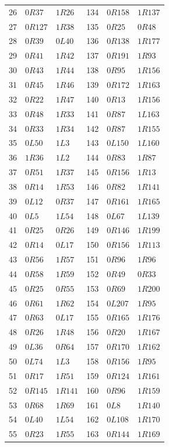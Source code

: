 \begin{longtable}{rll@{\qquad}rll}
26 & $0R37$ & $1R26$ & 134 & $0R158$ & $1R137$\\
27 & $0R127$ & $1R38$ & 135 & $0R25$ & $0R48$\\
28 & $0R39$ & $0L40$ & 136 & $0R138$ & $1R177$\\
29 & $0R41$ & $1R42$ & 137 & $0R191$ & $1R93$\\
30 & $0R43$ & $1R44$ & 138 & $0R95$ & $1R156$\\
31 & $0R45$ & $1R46$ & 139 & $0R172$ & $1R163$\\
32 & $0R22$ & $1R47$ & 140 & $0R13$ & $1R156$\\
33 & $0R48$ & $1R33$ & 141 & $0R87$ & $1L163$\\
34 & $0R33$ & $1R34$ & 142 & $0R87$ & $1R155$\\
35 & $0L50$ & $1L3$ & 143 & $0L150$ & $1L160$\\
36 & $1R36$ & $1L2$ & 144 & $0R83$ & $1R87$\\
37 & $0R51$ & $1R37$ & 145 & $0R156$ & $1R13$\\
38 & $0R14$ & $1R53$ & 146 & $0R82$ & $1R141$\\
39 & $0L12$ & $0R37$ & 147 & $0R161$ & $1R165$\\
40 & $0L5$ & $1L54$ & 148 & $0L67$ & $1L139$\\
41 & $0R25$ & $0R26$ & 149 & $0R146$ & $1R199$\\
42 & $0R14$ & $0L17$ & 150 & $0R156$ & $1R113$\\
43 & $0R56$ & $1R57$ & 151 & $0R96$ & $1R96$\\
44 & $0R58$ & $1R59$ & 152 & $0R49$ & $0R33$\\
45 & $0R25$ & $0R55$ & 153 & $0R69$ & $1R200$\\
46 & $0R61$ & $1R62$ & 154 & $0L207$ & $1R95$\\
47 & $0R63$ & $0L17$ & 155 & $0R165$ & $1R176$\\
48 & $0R26$ & $1R48$ & 156 & $0R20$ & $1R167$\\
49 & $0L36$ & $0R64$ & 157 & $0R170$ & $1R162$\\
50 & $0L74$ & $1L3$ & 158 & $0R156$ & $1R95$\\
51 & $0R17$ & $1R51$ & 159 & $0R124$ & $1R161$\\
52 & $0R145$ & $1R141$ & 160 & $0R96$ & $1R159$\\
53 & $0R68$ & $1R69$ & 161 & $0L8$ & $1R140$\\
54 & $0L40$ & $1L54$ & 162 & $0L108$ & $1R170$\\
55 & $0R23$ & $1R55$ & 163 & $0R144$ & $1R169$\\

\end{longtable}
